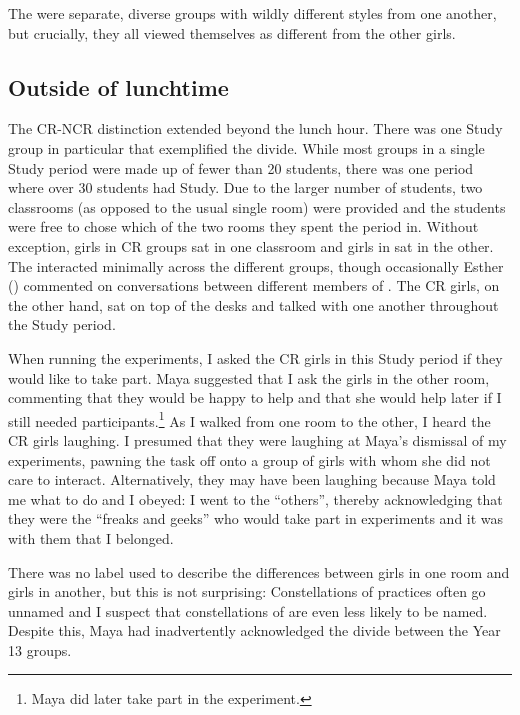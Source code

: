 \largerpage
\noindent  The  were separate, diverse groups with wildly different styles from one another, but crucially, they all viewed themselves as different from the other girls. 


\subsection{Outside of lunchtime}

The CR-NCR distinction extended beyond the lunch hour. There was one Study group in particular that exemplified the divide. While most groups in a single Study period were made up of fewer than 20 students, there was one period where over 30 students had Study. Due to the larger number of students, two classrooms (as opposed to the usual single room) were provided and the students were free to chose which of the two rooms they spent the period in. Without exception, girls in CR groups sat in one classroom and girls in  sat in the other. The  interacted minimally across the different groups, though occasionally Esther () commented on conversations between different members of . The CR girls, on the other hand, sat on top of the desks and talked with one another throughout the Study period.

When running the  experiments, I asked the CR girls in this Study period if they would like to take part. Maya suggested that I ask the girls in the other room, commenting that they would be happy to help and that she would help later if I still needed participants.\footnote{Maya did later take part in the experiment.}  As I walked from one room to the other, I heard the CR girls laughing. I presumed that they were laughing at Maya's dismissal of my experiments, pawning the task off onto a group of girls with whom she did not care to interact. Alternatively, they may have been laughing because Maya told me what to do and I obeyed: I went to the ``others'', thereby acknowledging that they were the ``freaks and geeks'' who would take part in experiments and it was with them that I belonged. 

There was no label used to describe the differences between girls in one room and girls in another, but this is not surprising: Constellations of practices often go unnamed \citep[128]{wenger1998} and I suspect that constellations of  are even less likely to be named. Despite this, Maya had inadvertently acknowledged the divide between the Year 13 groups.



